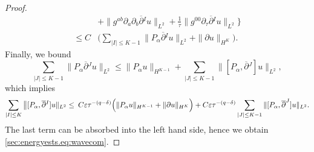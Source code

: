 \documentclass{article}
\newcommand{\ol}{\overline}
\newcommand{\ve}{\varepsilon}
\newcommand{\pa}{\partial}
\begin{document}
\begin{proof}
\begin{align}
        &+\|g^{ab}\pa_a\pa_b\ol{\pa}{}^I u\|_{L^2} +\frac{1}{\tau}\|g^{00}\pa_\tau \ol{\pa}{}^I u\|_{L^2} \Big\}\nonumber\\
        \leq C&\Big(\sum_{|I|\leq K-1}\|P_\alpha \ol{\pa}{}^I u\|_{L^2} + \|\pa u\|_{H^K}\Big).
    \end{align}
    Finally, we bound
    \begin{equation}
        \sum_{|J|\leq K-1}\|P_\alpha \ol{\pa}{}^J u\|_{L^2} \leq \|P_\alpha u\|_{H^{K-1}} + \sum_{|J|\leq K-1}\|[P_\alpha,\ol{\pa}{}^J]u\|_{L^2},
    \end{equation}
    which implies
    \begin{equation}
        \sum_{|I|\leq K}\big\|[P_\alpha ,\ol{\pa}{}^I]u\|_{L^2}\leq \>C\ve\tau^{-(q-\delta)} \Big(\|P_\alpha u\|_{H^{K-1}}+\|\pa u\|_{H^K}\Big)\\+ C\ve \tau^{-(q-\delta)}\sum_{|J|\leq K-1}\|[P_\alpha,\ol{\pa}^J]u\|_{L^2}. 
    \end{equation}
    The last term can be absorbed into the left hand side, hence we obtain \eqref{sec:energyests.eq:wavecom}.
\end{proof}
\end{document}
